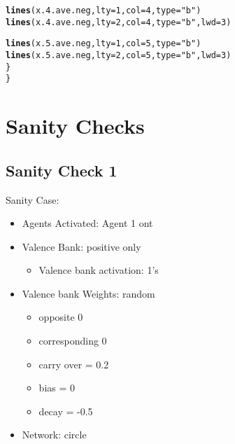 \documentclass{article}\usepackage[]{graphicx}\usepackage[]{color}
\makeatletter
\newcommand{\hlnum}[1]{\textcolor[rgb]{0.686,0.059,0.569}{#1}}%
\newcommand{\hlstr}[1]{\textcolor[rgb]{0.192,0.494,0.8}{#1}}%
\newcommand{\hlstd}[1]{\textcolor[rgb]{0.345,0.345,0.345}{#1}}%
\newcommand{\hlkwc}[1]{\textcolor[rgb]{0.333,0.667,0.333}{#1}}%
\newcommand{\hlkwd}[1]{\textcolor[rgb]{0.737,0.353,0.396}{\textbf{#1}}}%
\newenvironment{kframe}{%
 \def\at@end@of@kframe{}%
 \ifinner\ifhmode%
  \def\at@end@of@kframe{\end{minipage}}%
  \begin{minipage}{\columnwidth}%
 \fi\fi%
 \def\FrameCommand##1{\hskip\@totalleftmargin \hskip-\fboxsep
 \colorbox{shadecolor}{##1}\hskip-\fboxsep
     \hskip-\linewidth \hskip-\@totalleftmargin \hskip\columnwidth}%
 \MakeFramed {\advance\hsize-\width
   \@totalleftmargin\z@ \linewidth\hsize
   \@setminipage}}%
 {\par\unskip\endMakeFramed%
 \at@end@of@kframe}
\newenvironment{knitrout}{}{} %
\makeatother
\begin{document}
\begin{knitrout}
\begin{kframe}
\begin{alltt}
        \hlkwd{lines}\hlstd{(x.4.ave.neg,} \hlkwc{lty} \hlstd{=} \hlnum{1}\hlstd{,} \hlkwc{col} \hlstd{=} \hlnum{4}\hlstd{,} \hlkwc{type} \hlstd{=} \hlstr{"b"}\hlstd{)}
        \hlkwd{lines}\hlstd{(x.4.ave.neg,} \hlkwc{lty} \hlstd{=} \hlnum{2}\hlstd{,} \hlkwc{col} \hlstd{=} \hlnum{4}\hlstd{,} \hlkwc{type} \hlstd{=} \hlstr{"b"}\hlstd{,} \hlkwc{lwd} \hlstd{=} \hlnum{3}\hlstd{)}

        \hlkwd{lines}\hlstd{(x.5.ave.neg,} \hlkwc{lty} \hlstd{=} \hlnum{1}\hlstd{,} \hlkwc{col} \hlstd{=} \hlnum{5}\hlstd{,} \hlkwc{type} \hlstd{=} \hlstr{"b"}\hlstd{)}
        \hlkwd{lines}\hlstd{(x.5.ave.neg,} \hlkwc{lty} \hlstd{=} \hlnum{2}\hlstd{,} \hlkwc{col} \hlstd{=} \hlnum{5}\hlstd{,} \hlkwc{type} \hlstd{=} \hlstr{"b"}\hlstd{,} \hlkwc{lwd} \hlstd{=} \hlnum{3}\hlstd{)}
    \hlstd{\}}
\hlstd{\}}
\end{alltt}
\end{kframe}
\end{knitrout}


\newpage

\section{Sanity Checks}
\label{sec:sanity-checks}

\subsection{Sanity Check 1}
\label{sec:sanity1}
Sanity Case:
\begin{itemize}
  \item Agents Activated: Agent 1 ont
  \item Valence Bank: positive only
  \begin{itemize}
      \item Valence bank activation: 1's
  \end{itemize}
  \item Valence bank Weights: random
  \begin{itemize}
      \item opposite 0
      \item corresponding 0
      \item carry over = 0.2
      \item bias = 0
      \item decay = -0.5
  \end{itemize}
  \item Network: circle
\end{itemize}
\end{document}
